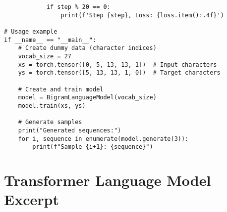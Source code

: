\documentclass[11pt,a4paper]{book}
\begin{document}
\begin{verbatim}
            if step % 20 == 0:
                print(f'Step {step}, Loss: {loss.item():.4f}')

# Usage example
if __name__ == "__main__":
    # Create dummy data (character indices)
    vocab_size = 27
    xs = torch.tensor([0, 5, 13, 13, 1])  # Input characters
    ys = torch.tensor([5, 13, 13, 1, 0])  # Target characters
    
    # Create and train model
    model = BigramLanguageModel(vocab_size)
    model.train(xs, ys)
    
    # Generate samples
    print("Generated sequences:")
    for i, sequence in enumerate(model.generate(3)):
        print(f"Sample {i+1}: {sequence}")
\end{verbatim}

\section{Transformer Language Model Excerpt}
\end{document}
